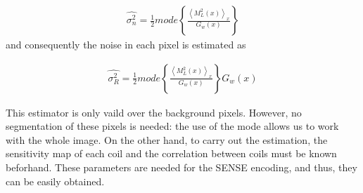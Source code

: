 \begin{equation}
\begin{aligned}
\widehat{\sigma_n^2}=\frac{1}{2}mode\left \{ \frac{\left \langle M_L^2(x) \right \rangle_x}{G_w(x)} \right \}
\end{aligned}
\end{equation}
and consequently the noise in each pixel is estimated as

\begin{equation}
\begin{aligned}
\widehat{\sigma_R^2}=\frac{1}{2}mode\left \{ \frac{\left \langle M_L^2(x) \right \rangle_x}{G_w(x)} \right \}G_w(x)
\end{aligned}
\end{equation}

This estimator is only vaild over the background pixels. However, no segmentation of these pixels is needed: the use of the mode allows us to work with the whole image. On the other hand, to carry out the estimation, the sensitivity map of each coil and the correlation between coils must be known beforhand. These parameters are needed for the SENSE encoding, and thus, they can be easily obtained.
